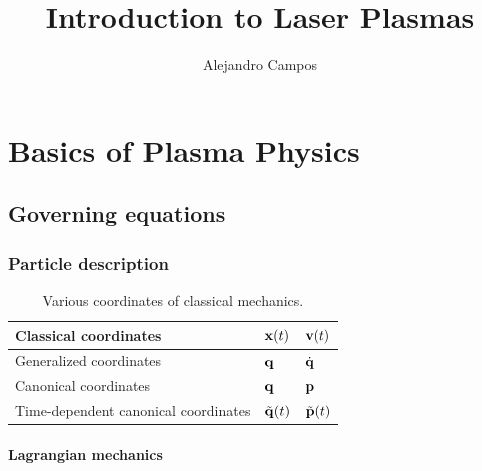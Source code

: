 \documentclass[a4paper,11pt]{report}
\title{Introduction to Laser Plasmas}
\author{Alejandro Campos}
\newcommand{\qvecdot}{\dot{\qvec}}
\begin{document}
\maketitle
\tableofcontents

\part{Basics of Plasma Physics}

\chapter{Governing equations}

\section{Particle description}
\begin{table}[H]
    \renewcommand{\arraystretch}{1.5}
    \centering
    \caption{Various coordinates of classical mechanics. }
    \label{tb:classical_mechanics_coordinates}
     \begin{tabular}{l|l|l}
        Classical coordinates & $\mathbf{x}(t)$ & $\mathbf{v}(t)$ \\
        \hline
        Generalized coordinates  & $\mathbf{q}$ & $\qvecdot$ \\
        \hline
        Canonical coordinates & $\mathbf{q}$ & $\mathbf{p}$ \\
        \hline
        Time-dependent canonical coordinates & $\tilde{\mathbf{q}}(t)$ & $ \tilde{\mathbf{p}}(t)$ \\
     \end{tabular}
\end{table}
    
\subsection{Lagrangian mechanics}
    
\end{document}
